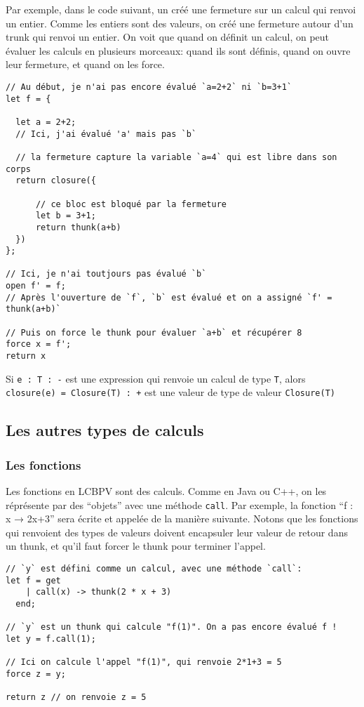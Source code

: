 \documentclass[
]{article}
\begin{document}
Par exemple, dans le code suivant, un créé une fermeture sur un calcul
qui renvoi un entier. Comme les entiers sont des valeurs, on créé une
fermeture autour d'un trunk qui renvoi un entier. On voit que quand on
définit un calcul, on peut évaluer les calculs en plusieurs morceaux:
quand ils sont définis, quand on ouvre leur fermeture, et quand on les
force.

\begin{verbatim}
// Au début, je n'ai pas encore évalué `a=2+2` ni `b=3+1`
let f = {

  let a = 2+2;
  // Ici, j'ai évalué 'a' mais pas `b`
    
  // la fermeture capture la variable `a=4` qui est libre dans son corps 
  return closure({
  
      // ce bloc est bloqué par la fermeture
      let b = 3+1;
      return thunk(a+b)
  })
};
  
// Ici, je n'ai toutjours pas évalué `b`
open f' = f;
// Après l'ouverture de `f`, `b` est évalué et on a assigné `f' = thunk(a+b)` 
  
// Puis on force le thunk pour évaluer `a+b` et récupérer 8
force x = f';
return x
\end{verbatim}

Si \texttt{e\ :\ T\ :\ -} est une expression qui renvoie un calcul de
type \texttt{T}, alors \texttt{closure(e)\ =\ Closure(T)\ :\ +} est une
valeur de type de valeur \texttt{Closure(T)}

\hypertarget{les-autres-types-de-calculs}{%
\subsection{Les autres types de
calculs}\label{les-autres-types-de-calculs}}

\hypertarget{les-fonctions}{%
\subsubsection{Les fonctions}\label{les-fonctions}}

Les fonctions en LCBPV sont des calculs. Comme en Java ou C++, on les
réprésente par des ``objets'' avec une méthode \texttt{call}. Par
exemple, la fonction ``f : x → 2x+3'' sera écrite et appelée de la
manière suivante. Notons que les fonctions qui renvoient des types de
valeurs doivent encapsuler leur valeur de retour dans un thunk, et qu'il
faut forcer le thunk pour terminer l'appel.

\begin{verbatim}
// `y` est défini comme un calcul, avec une méthode `call`:
let f = get 
    | call(x) -> thunk(2 * x + 3)
  end;
  
// `y` est un thunk qui calcule "f(1)". On a pas encore évalué f !
let y = f.call(1);

// Ici on calcule l'appel "f(1)", qui renvoie 2*1+3 = 5
force z = y;

return z // on renvoie z = 5
\end{verbatim}
\end{document}
